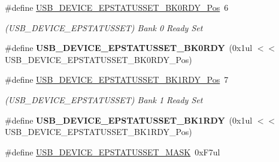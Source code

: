 \begin{DoxyCompactItemize}
\item 
\hypertarget{group___s_a_m_l21___u_s_b_ga6af786fbaa30ffbc8723e0d56c7479bd}{}\#define \hyperlink{group___s_a_m_l21___u_s_b_ga6af786fbaa30ffbc8723e0d56c7479bd}{U\+S\+B\+\_\+\+D\+E\+V\+I\+C\+E\+\_\+\+E\+P\+S\+T\+A\+T\+U\+S\+S\+E\+T\+\_\+\+B\+K0\+R\+D\+Y\+\_\+\+Pos}~6\label{group___s_a_m_l21___u_s_b_ga6af786fbaa30ffbc8723e0d56c7479bd}

\begin{DoxyCompactList}\small\item\em (U\+S\+B\+\_\+\+D\+E\+V\+I\+C\+E\+\_\+\+E\+P\+S\+T\+A\+T\+U\+S\+S\+E\+T) Bank 0 Ready Set \end{DoxyCompactList}\item 
\hypertarget{group___s_a_m_l21___u_s_b_ga8b0d7ad58ae2be32b26bc3ebc41faf0d}{}\#define {\bfseries U\+S\+B\+\_\+\+D\+E\+V\+I\+C\+E\+\_\+\+E\+P\+S\+T\+A\+T\+U\+S\+S\+E\+T\+\_\+\+B\+K0\+R\+D\+Y}~(0x1ul $<$$<$ U\+S\+B\+\_\+\+D\+E\+V\+I\+C\+E\+\_\+\+E\+P\+S\+T\+A\+T\+U\+S\+S\+E\+T\+\_\+\+B\+K0\+R\+D\+Y\+\_\+\+Pos)\label{group___s_a_m_l21___u_s_b_ga8b0d7ad58ae2be32b26bc3ebc41faf0d}

\item 
\hypertarget{group___s_a_m_l21___u_s_b_gaab24037420b07a4688539994ec6b733a}{}\#define \hyperlink{group___s_a_m_l21___u_s_b_gaab24037420b07a4688539994ec6b733a}{U\+S\+B\+\_\+\+D\+E\+V\+I\+C\+E\+\_\+\+E\+P\+S\+T\+A\+T\+U\+S\+S\+E\+T\+\_\+\+B\+K1\+R\+D\+Y\+\_\+\+Pos}~7\label{group___s_a_m_l21___u_s_b_gaab24037420b07a4688539994ec6b733a}

\begin{DoxyCompactList}\small\item\em (U\+S\+B\+\_\+\+D\+E\+V\+I\+C\+E\+\_\+\+E\+P\+S\+T\+A\+T\+U\+S\+S\+E\+T) Bank 1 Ready Set \end{DoxyCompactList}\item 
\hypertarget{group___s_a_m_l21___u_s_b_ga08e0c82fa316f0e828b90f1c5436f87a}{}\#define {\bfseries U\+S\+B\+\_\+\+D\+E\+V\+I\+C\+E\+\_\+\+E\+P\+S\+T\+A\+T\+U\+S\+S\+E\+T\+\_\+\+B\+K1\+R\+D\+Y}~(0x1ul $<$$<$ U\+S\+B\+\_\+\+D\+E\+V\+I\+C\+E\+\_\+\+E\+P\+S\+T\+A\+T\+U\+S\+S\+E\+T\+\_\+\+B\+K1\+R\+D\+Y\+\_\+\+Pos)\label{group___s_a_m_l21___u_s_b_ga08e0c82fa316f0e828b90f1c5436f87a}

\item 
\hypertarget{group___s_a_m_l21___u_s_b_gaa9092d794a1a4a16b858480636d7d180}{}\#define \hyperlink{group___s_a_m_l21___u_s_b_gaa9092d794a1a4a16b858480636d7d180}{U\+S\+B\+\_\+\+D\+E\+V\+I\+C\+E\+\_\+\+E\+P\+S\+T\+A\+T\+U\+S\+S\+E\+T\+\_\+\+M\+A\+S\+K}~0x\+F7ul\label{group___s_a_m_l21___u_s_b_gaa9092d794a1a4a16b858480636d7d180}


\end{DoxyCompactItemize}
